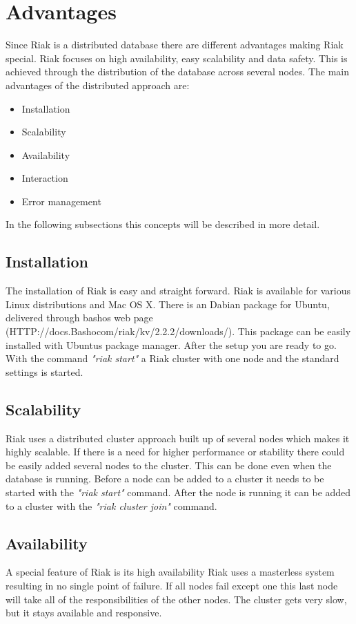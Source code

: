 \section{Advantages}
Since Riak is a distributed database there are different advantages making Riak special. Riak focuses on high availability, easy scalability and data safety. This is achieved through the distribution of the database across several nodes. The main advantages of the distributed approach are:
\begin{itemize}
	\item Installation
	\item Scalability
	\item Availability
	\item Interaction
	\item Error management
\end{itemize}
In the following subsections this concepts will be described in more detail.
\subsection{Installation}
The installation of Riak is easy and straight forward. Riak is available for various Linux distributions and Mac OS X. There is an Dabian package for Ubuntu, delivered through bashos web page (HTTP://docs.Bashocom/riak/kv/2.2.2/downloads/). This package can be easily installed with Ubuntus package manager. After the setup you are ready to go. With the command \textit{"riak start"} a Riak cluster with one node and the standard settings is started.
\subsection{Scalability}
Riak uses a distributed cluster approach built up of several nodes which makes it highly scalable. If there is a need for higher performance or stability there could be easily added several nodes to the cluster. This can be done even when the database is running. 
Before a node can be added to a cluster it needs to be started with the \textit{"riak start"} command. After the node is running it can be added to a cluster with the \textit{"riak cluster join"} command.
\subsection{Availability}
A special feature of Riak is its high availability Riak uses a masterless system resulting in no single point of failure. If all nodes fail except one this last node will take all of the responsibilities of the other nodes. The cluster gets very slow, but it stays available and responsive.
